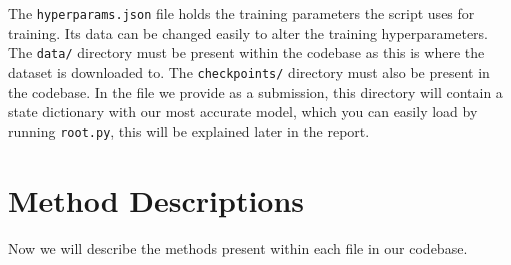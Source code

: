 \documentclass[]{report}
\begin{document}
The \texttt{hyperparams.json} file holds the training parameters the script uses for training. Its data can be changed easily to alter the training hyperparameters. The \texttt{data/} directory must be present within the codebase as this is where the dataset is downloaded to. The \texttt{checkpoints/} directory must also be present in the codebase. In the file we provide as a submission, this directory will contain a state dictionary with our most accurate model, which you can easily load by running \texttt{root.py}, this will be explained later in the report.

\newpage

\section*{Method Descriptions}

Now we will describe the methods present within each file in our codebase.
\end{document}
